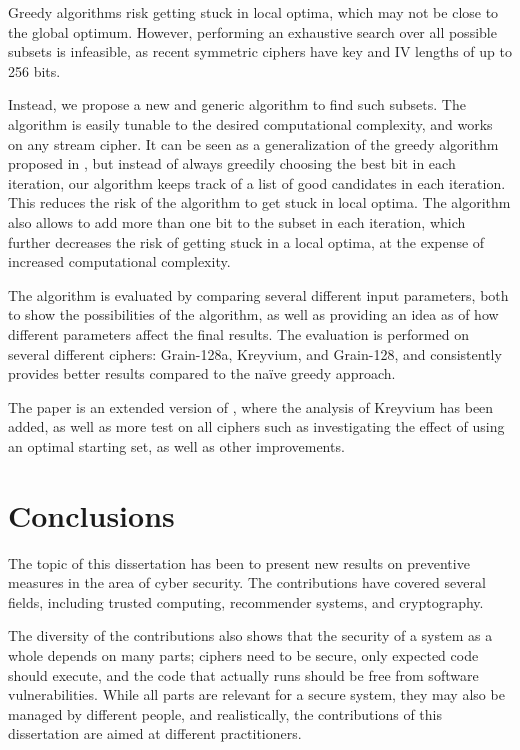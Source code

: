 Greedy algorithms risk getting stuck in local optima, which may not be close to the global optimum.
However, performing an exhaustive search over all possible subsets is infeasible, as recent symmetric ciphers have key and IV lengths of up to 256 bits.

Instead, we propose a new and generic algorithm to find such subsets.
The algorithm is easily tunable to the desired computational complexity, and works on any stream cipher.
It can be seen as a generalization of the greedy algorithm proposed in \cite{stankovski:2010}, but instead of always greedily choosing the best bit in each iteration, our algorithm keeps track of a list of good candidates in each iteration.
This reduces the risk of the algorithm to get stuck in local optima.
The algorithm also allows to add more than one bit to the subset in each iteration, which further decreases the risk of getting stuck in a local optima, at the expense of increased computational complexity.

The algorithm is evaluated by comparing several different input parameters, both to show the possibilities of the algorithm, as well as providing an idea as of how different parameters affect the final results.
The evaluation is performed on several different ciphers: Grain-128a, Kreyvium, and Grain-128, and consistently provides better results compared to the na\"{i}ve greedy approach.

The paper is an extended version of \cite{karlsson:2017}, where the analysis of Kreyvium has been added, as well as more test on all ciphers such as investigating the effect of using an optimal starting set, as well as other improvements.

\section{Conclusions}
\label{sec:kappa-conclusions}

The topic of this dissertation has been to present new results on preventive measures in the area of cyber security.
The contributions have covered several fields, including trusted computing, recommender systems, and cryptography.

The diversity of the contributions also shows that the security of a system as a whole depends on many parts; ciphers need to be secure, only expected code should execute, and the code that actually runs should be free from software vulnerabilities.
While all parts are relevant for a secure system, they may also be managed by different people, and realistically, the contributions of this dissertation are aimed at different practitioners.

